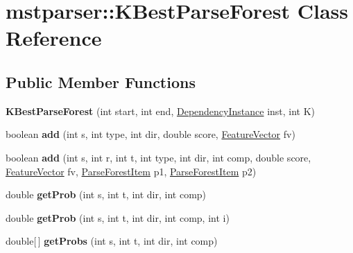 \hypertarget{classmstparser_1_1KBestParseForest}{
\section{mstparser::KBestParseForest Class Reference}
\label{classmstparser_1_1KBestParseForest}
}
\subsection*{Public Member Functions}
\begin{DoxyCompactItemize}
\item 
\hypertarget{classmstparser_1_1KBestParseForest_af3078f54092f53fc676789a2c2a8f8c5}{
{\bfseries KBestParseForest} (int start, int end, \hyperlink{classmstparser_1_1DependencyInstance}{DependencyInstance} inst, int K)}
\label{classmstparser_1_1KBestParseForest_af3078f54092f53fc676789a2c2a8f8c5}

\item 
\hypertarget{classmstparser_1_1KBestParseForest_a0c47096c0fad23a8ddcf6140e9ccd07d}{
boolean {\bfseries add} (int s, int type, int dir, double score, \hyperlink{classmstparser_1_1FeatureVector}{FeatureVector} fv)}
\label{classmstparser_1_1KBestParseForest_a0c47096c0fad23a8ddcf6140e9ccd07d}

\item 
\hypertarget{classmstparser_1_1KBestParseForest_a2345d80dd0940cb754f7e6f20d709bc1}{
boolean {\bfseries add} (int s, int r, int t, int type, int dir, int comp, double score, \hyperlink{classmstparser_1_1FeatureVector}{FeatureVector} fv, \hyperlink{classmstparser_1_1ParseForestItem}{ParseForestItem} p1, \hyperlink{classmstparser_1_1ParseForestItem}{ParseForestItem} p2)}
\label{classmstparser_1_1KBestParseForest_a2345d80dd0940cb754f7e6f20d709bc1}

\item 
\hypertarget{classmstparser_1_1KBestParseForest_a560082ed7e7af5b4936fa7bcff3de08c}{
double {\bfseries getProb} (int s, int t, int dir, int comp)}
\label{classmstparser_1_1KBestParseForest_a560082ed7e7af5b4936fa7bcff3de08c}

\item 
\hypertarget{classmstparser_1_1KBestParseForest_a48f509af07258f31a5f8c678919c64b6}{
double {\bfseries getProb} (int s, int t, int dir, int comp, int i)}
\label{classmstparser_1_1KBestParseForest_a48f509af07258f31a5f8c678919c64b6}

\item 
\hypertarget{classmstparser_1_1KBestParseForest_af941021f5c7aec7fcadf7fcbb8aa85b1}{
double\mbox{[}$\,$\mbox{]} {\bfseries getProbs} (int s, int t, int dir, int comp)}
\label{classmstparser_1_1KBestParseForest_af941021f5c7aec7fcadf7fcbb8aa85b1}


\end{DoxyCompactItemize}
